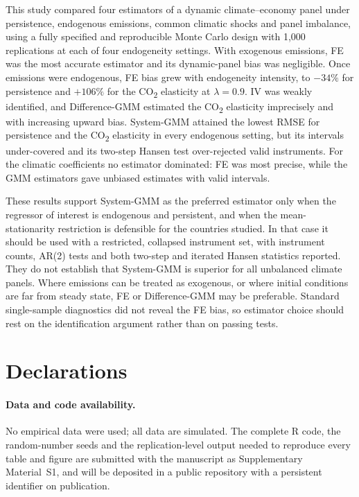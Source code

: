\documentclass[11pt,a4paper]{article}
\newif\ifshowverify
\newcommand{\verify}[1]{\ifshowverify\textcolor{red}{\,[\textit{Authors to complete:} #1]}\fi}
\newcommand{\COtwo}{CO\textsubscript{2}}
\begin{document}
This study compared four estimators of a dynamic climate--economy panel under persistence, endogenous emissions, common climatic shocks and panel imbalance, using a fully specified and reproducible Monte Carlo design with 1{,}000 replications at each of four endogeneity settings. With exogenous emissions, FE was the most accurate estimator and its dynamic-panel bias was negligible. Once emissions were endogenous, FE bias grew with endogeneity intensity, to $-34\%$ for persistence and $+106\%$ for the \COtwo{} elasticity at $\lambda=0.9$. IV was weakly identified, and Difference-GMM estimated the \COtwo{} elasticity imprecisely and with increasing upward bias. System-GMM attained the lowest RMSE for persistence and the \COtwo{} elasticity in every endogenous setting, but its intervals under-covered and its two-step Hansen test over-rejected valid instruments. For the climatic coefficients no estimator dominated: FE was most precise, while the GMM estimators gave unbiased estimates with valid intervals.

These results support System-GMM as the preferred estimator only when the regressor of interest is endogenous and persistent, and when the mean-stationarity restriction is defensible for the countries studied. In that case it should be used with a restricted, collapsed instrument set, with instrument counts, AR(2) tests and both two-step and iterated Hansen statistics reported. They do not establish that System-GMM is superior for all unbalanced climate panels. Where emissions can be treated as exogenous, or where initial conditions are far from steady state, FE or Difference-GMM may be preferable. Standard single-sample diagnostics did not reveal the FE bias, so estimator choice should rest on the identification argument rather than on passing tests.

\section*{Declarations}

\paragraph{Data and code availability.} No empirical data were used; all data are simulated. The complete R code, the random-number seeds and the replication-level output needed to reproduce every table and figure are submitted with the manuscript as Supplementary Material~S1, and will be deposited in a public repository with a persistent identifier on publication.\verify{insert repository DOI if deposited before submission}
\end{document}
